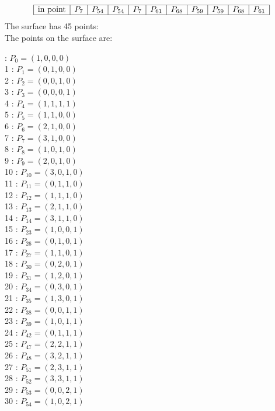 \documentclass{article}
\begin{document}
{$$\begin{array}{|r*{10}{|c}|}
\hline
\mbox{in point}  & P_{7} & P_{54} & P_{54} & P_{7} & P_{61} & P_{68} & P_{59} & P_{59} & P_{68} & P_{61}\\
\hline
\end{array}
$$
The surface has 45 points:\\
The points on the surface are:\\
\begin{multicols}{3}
 : $P_{0}=( 1, 0, 0, 0 )$\\
1 : $P_{1}=( 0, 1, 0, 0 )$\\
2 : $P_{2}=( 0, 0, 1, 0 )$\\
3 : $P_{3}=( 0, 0, 0, 1 )$\\
4 : $P_{4}=( 1, 1, 1, 1 )$\\
5 : $P_{5}=( 1, 1, 0, 0 )$\\
6 : $P_{6}=( 2, 1, 0, 0 )$\\
7 : $P_{7}=( 3, 1, 0, 0 )$\\
8 : $P_{8}=( 1, 0, 1, 0 )$\\
9 : $P_{9}=( 2, 0, 1, 0 )$\\
10 : $P_{10}=( 3, 0, 1, 0 )$\\
11 : $P_{11}=( 0, 1, 1, 0 )$\\
12 : $P_{12}=( 1, 1, 1, 0 )$\\
13 : $P_{13}=( 2, 1, 1, 0 )$\\
14 : $P_{14}=( 3, 1, 1, 0 )$\\
15 : $P_{23}=( 1, 0, 0, 1 )$\\
16 : $P_{26}=( 0, 1, 0, 1 )$\\
17 : $P_{27}=( 1, 1, 0, 1 )$\\
18 : $P_{30}=( 0, 2, 0, 1 )$\\
19 : $P_{31}=( 1, 2, 0, 1 )$\\
20 : $P_{34}=( 0, 3, 0, 1 )$\\
21 : $P_{35}=( 1, 3, 0, 1 )$\\
22 : $P_{38}=( 0, 0, 1, 1 )$\\
23 : $P_{39}=( 1, 0, 1, 1 )$\\
24 : $P_{42}=( 0, 1, 1, 1 )$\\
25 : $P_{47}=( 2, 2, 1, 1 )$\\
26 : $P_{48}=( 3, 2, 1, 1 )$\\
27 : $P_{51}=( 2, 3, 1, 1 )$\\
28 : $P_{52}=( 3, 3, 1, 1 )$\\
29 : $P_{53}=( 0, 0, 2, 1 )$\\
30 : $P_{54}=( 1, 0, 2, 1 )$\\

\end{multicols}}
\end{document}
